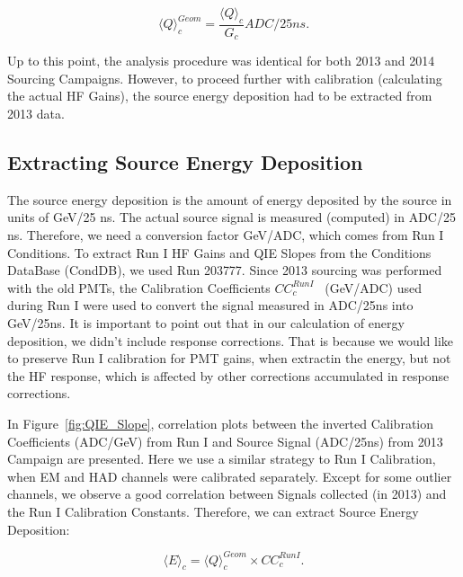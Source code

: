 \begin{center}
   \begin{equation}
      \label{eq:Sig_Corr}
      {\langle{Q}\rangle}^{Geom}_{c} = \frac{{\langle{Q}\rangle}_{c}}{G_{c}}\unit{ADC/25ns}.
   \end{equation}
\end{center}

Up to this point, the analysis procedure was identical for both 2013 and 2014
Sourcing Campaigns. However, to proceed further with calibration (calculating the
actual HF Gains), the source energy deposition had to be extracted from 2013 data.

\subsection{Extracting Source Energy Deposition}
The source energy deposition is the amount of energy deposited by the source in
units of GeV/25 ns. The actual source signal is measured (computed) in
ADC/25 ns. Therefore, we need a conversion factor GeV/ADC, which comes from
Run I Conditions. To extract Run I HF Gains and QIE Slopes from the Conditions DataBase (CondDB), we used Run 203777. Since 2013 sourcing was performed with the old PMTs, the
Calibration Coefficients ${CC}^{Run I}_{c}$~ (GeV/ADC) used during Run I were used to convert
the signal measured in ADC/25\unit{ns} into GeV/25\unit{ns}. It is important to point out that in our calculation of energy deposition, we didn't include response corrections. That is because we would like to preserve Run I calibration for PMT gains, when extractin the energy, but not the HF response, which is affected by other corrections accumulated in response corrections.

In Figure~\ref{fig:QIE_Slope}, correlation plots between the inverted Calibration
Coefficients (ADC/GeV) from Run I and Source Signal (ADC/25\unit{ns}) from 2013
Campaign are presented. Here we use a similar strategy to Run I Calibration, when
EM and HAD channels were calibrated separately. Except for some outlier channels,
we observe a good correlation between Signals collected (in 2013) and the Run I
Calibration Constants. Therefore, we can extract Source Energy Deposition:

\begin{center}
	\begin{equation}
		\label{eq:Edep}
		{\langle{E}\rangle}_{c} = {\langle{Q}\rangle}^{Geom}_{c} \times {CC^{Run I}_{c}}.
	\end{equation}
\end{center}


